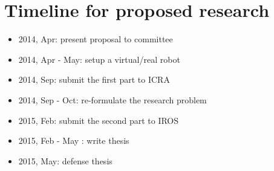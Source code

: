 \chapter{Timeline for proposed research}

\begin{itemize}
  \item 2014, Apr: present proposal to committee
  \item 2014, Apr - May: setup a virtual/real robot 
  \item 2014, Sep: submit the first part to ICRA
  \item 2014, Sep - Oct: re-formulate the research problem 
  \item 2015, Feb: submit the second part to IROS
  \item 2015, Feb - May : write thesis
  \item 2015, May: defense thesis
\end{itemize}
